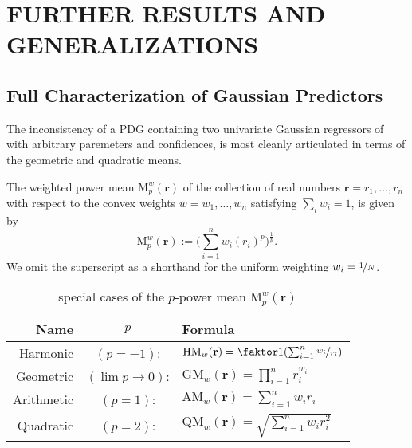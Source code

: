 \documentclass[twoside]{article}
\theoremstyle{plain}
\theoremstyle{definition}
\begin{document}
\section{FURTHER RESULTS AND GENERALIZATIONS}
\subsection{Full Characterization of Gaussian Predictors}
The inconsistency of a PDG containing two univariate Gaussian regressors of with arbitrary paremeters and confidences, is most cleanly articulated in terms of the geometric and quadratic means.

\begin{defn}
	The weighted power mean $\mathrm M^w_p(\mathbf r)$ of the collection of real numbers $\mathbf r = r_1, \ldots, r_n$ with respect to the convex weights $w = w_1, \ldots, w_n$ satisfying $\sum_iw_i = 1$, is given by
	\[
		\mathrm M^w_p(\mathbf r) := \Big(\sum_{i=1}^n w_i (r_i)^p \Big)^{\frac1p}.
	\]
	We omit the superscript as a shorthand for the uniform weighting $w_i = \nicefrac{1}{N}$.
\end{defn}

\begin{table}
\centering
\renewcommand{\arraystretch}{1.5} %
\begin{tabular}{rcl}
	\textbf{Name} & $p$ & \textbf{Formula}\\\hline
	Harmonic&$(p=-1)$:& $\mathrm{HM}_w(\mathbf r) = \faktor1{\left(\sum_{i=1}^n \nicefrac{w_i}{r_i}\right)}$ \\
	Geometric&$(\lim {p\to 0})$:& $\mathrm{GM}_w(\mathbf r) = \prod_{i=1}^n r_i^{w_i}$ \\
	Arithmetic&$(p=1)$:& $\mathrm{AM}_w(\mathbf r) = \sum_{i=1}^n w_i r_i$ \\
	Quadratic&$(p=2)$:& $\mathrm{QM}_w(\mathbf r) = \sqrt{\textstyle\sum_{i=1}^n w_i r_i^2}$\\\hline
	\end{tabular}
	\caption{special cases of the $p$-power mean $\mathrm M_p^w(\mathbf r)$}
	\label{tab:power-means}
\end{table}
\end{document}
